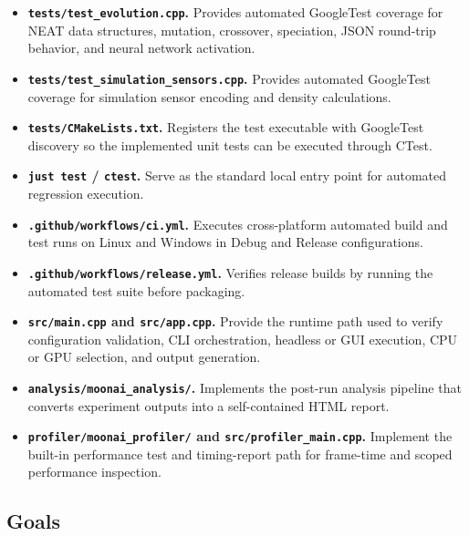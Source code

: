 \begin{itemize}[leftmargin=*]
	\item \textbf{\texttt{tests/test\_evolution.cpp}.} Provides automated GoogleTest coverage
	      for NEAT data structures, mutation, crossover, speciation, JSON round-trip behavior,
	      and neural network activation.

	\item \textbf{\texttt{tests/test\_simulation\_sensors.cpp}.} Provides automated
	      GoogleTest coverage for simulation sensor encoding and density calculations.

	\item \textbf{\texttt{tests/CMakeLists.txt}.} Registers the test executable with
	      GoogleTest discovery so the implemented unit tests can be executed through CTest.

	\item \textbf{\texttt{just test} / \texttt{ctest}.} Serve as the standard local entry
	      point for automated regression execution.

	\item \textbf{\texttt{.github/workflows/ci.yml}.} Executes cross-platform automated
	      build and test runs on Linux and Windows in Debug and Release configurations.

	\item \textbf{\texttt{.github/workflows/release.yml}.} Verifies release builds by
	      running the automated test suite before packaging.

	\item \textbf{\texttt{src/main.cpp} and \texttt{src/app.cpp}.} Provide the runtime path
	      used to verify configuration validation, CLI orchestration, headless or GUI execution,
	      CPU or GPU selection, and output generation.

	\item \textbf{\texttt{analysis/moonai\_analysis/}.} Implements the post-run analysis
	      pipeline that converts experiment outputs into a self-contained HTML report.

	\item \textbf{\texttt{profiler/moonai\_profiler/} and \texttt{src/profiler\_main.cpp}.}
	      Implement the built-in performance test and timing-report path for frame-time and
	      scoped performance inspection.
\end{itemize}

\subsection{Goals}

